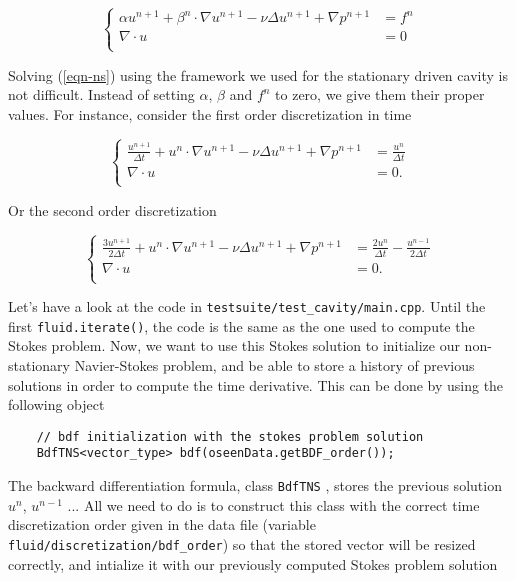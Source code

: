 \begin{equation*} \label{eqn-ns}
\left\{
\begin{array}{rl}
\displaystyle \alpha u^{n+1} + \beta^n \cdot \nabla u^{n+1} - \nu \Delta u^{n+1}+
\nabla p^{n+1} & = f^n  \\
\displaystyle \nabla \cdot u & = 0  \\
\end{array}
\right.
\end{equation*}

Solving (\ref{eqn-ns}) using the framework we used for the stationary driven cavity is not difficult.
Instead of setting $\alpha$, $\beta$ and $f^n$ to zero, we give them their proper values. For instance,
consider the first order discretization in time

\begin{equation*} \label{eqn-nso1}
\left\{
\begin{array}{rl}
\displaystyle \frac {u^{n+1}}{\Delta t} + u^n \cdot \nabla u^{n+1} - \nu \Delta u^{n+1}+
\nabla p^{n+1} & = \displaystyle \frac{u^n}{\Delta t}  \\
\displaystyle \nabla \cdot u & = 0. \\
\end{array}
\right.
\end{equation*}

Or the second order discretization 

\begin{equation*} \label{eqn-nso2}
\left\{
\begin{array}{rl}
\displaystyle \frac {3u^{n+1}}{2\Delta t} + u^n \cdot \nabla u^{n+1} - \nu \Delta u^{n+1}+
\nabla p^{n+1} & = \displaystyle \frac{2u^n}{\Delta t} - \frac{u^{n-1}}{2\Delta t}  \\
\displaystyle \nabla \cdot u & = 0. \\
\end{array}
\right.
\end{equation*}

Let's have a look at the code in \verb!testsuite/test_cavity/main.cpp!.
Until the first \verb!fluid.iterate()!, the code is the same as the one used to compute the Stokes problem.
Now, we want to use this Stokes solution to initialize our non-stationary Navier-Stokes problem, and be able
to store a history of previous solutions in order to compute the time derivative.
This can be done by using the following object 
\begin{verbatim}
    // bdf initialization with the stokes problem solution
    BdfTNS<vector_type> bdf(oseenData.getBDF_order());
\end{verbatim}
The backward differentiation formula, class \verb!BdfTNS! , 
stores the previous solution $u^n$, $u^{n-1}$ ... 
All we need to do is to construct this class
with the correct time discretization order given in the data file (variable \verb!fluid/discretization/bdf_order!) 
so that the stored vector will be resized correctly, and intialize it with our previously computed Stokes problem solution

